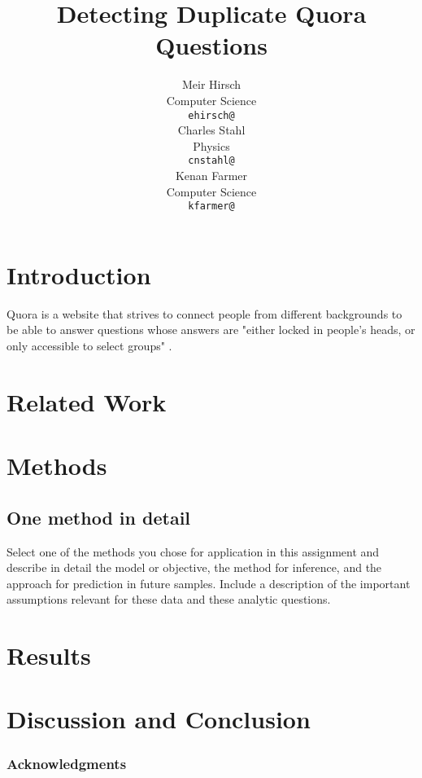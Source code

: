 \documentclass{article} %
\title{Detecting Duplicate Quora Questions}
\author{
Meir Hirsch \\
Computer Science\\
\texttt{ehirsch@} \\
\And
Charles Stahl \\
Physics \\
\texttt{cnstahl@} \\
\And
Kenan Farmer\\
Computer Science \\
\texttt{kfarmer@}\\
}
\begin{document}
\maketitle

\begin{abstract}

\end{abstract}

\section{Introduction}

Quora is a website that strives to connect people from different backgrounds to be able to answer questions whose answers are "either locked in people’s heads, or only accessible to select groups" \cite{quora}.

\section{Related Work}

\section{Methods}

\subsection{One method in detail}

Select one of the methods you chose for application in this assignment and describe in detail the model or objective, the method for inference, and the approach for prediction in future samples. Include a description of the important assumptions relevant for these data and these analytic questions.

\section{Results}

\section{Discussion and Conclusion}

\subsubsection*{Acknowledgments}


\printbibliography
\end{document}
